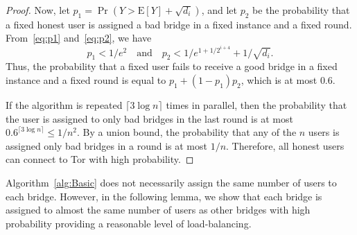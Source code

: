 \documentclass[a4paper,UKenglish]{lipics-v2016}
\newcommand{\E}{\mathbf{\mathrm{E}}}
\begin{document}
\begin{proof}
	Now, let ${p_1 = \Pr(Y > \E[Y] + \sqrt{d_i})}$, and let $p_2$ be the probability that a fixed honest user is assigned a bad bridge in a fixed instance and a fixed round. From~\eqref{eq:p1} and~\eqref{eq:p2}, we have
	\[p_1 < 1/e^2 \quad \text{and} \quad p_2 < 1/e^{1+1/2^{i+4}} + 1/\sqrt{d_i}.\]
	Thus, the probability that a fixed user fails to receive a good bridge in a fixed instance and a fixed round is equal to ${p_1 + (1-p_1)p_2}$, which is at most $0.6$.
	
	If the algorithm is repeated ${\lceil 3\log{n} \rceil}$ times in parallel, then the probability that the user is assigned to only bad bridges in the last round is at most ${0.6^{\lceil 3\log{n} \rceil} \leq 1/n^2}$.
	By a union bound, the probability that any of the $n$ users is assigned only bad bridges in a round is at most $1/n$. 
	Therefore, all honest users can connect to Tor with high probability.
\end{proof}


Algorithm~\ref{alg:Basic} does not necessarily assign the same number of users to each bridge. However, in the following lemma, we show that each bridge is assigned to almost the same number of users as other bridges with high probability providing a reasonable level of load-balancing.
\end{document}
